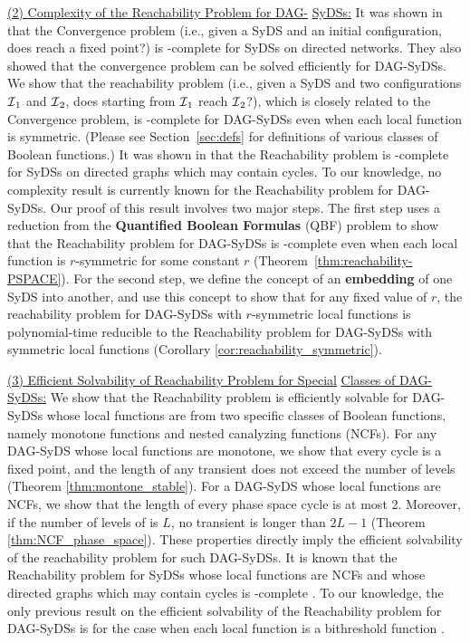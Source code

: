 \smallskip

\noindent
\underline{(2) Complexity of the Reachability Problem for DAG-}\newline
\underline{SyDSs:} 
It was shown in
\cite{Chistikov-etal-2020} that the Convergence problem
(i.e., given a SyDS \cals{} and an initial configuration,
does \cals{} reach a fixed point?) is \cpsp-complete
for SyDSs on directed networks.
They also showed that the convergence problem can be solved efficiently
for DAG-SyDSs.
We show that the reachability problem
(i.e., given a SyDS \cals{} and two configurations $\mbox{$\mathcal{I}$}_1$ and $\mbox{$\mathcal{I}$}_2$,
does \cals{} starting from $\mbox{$\mathcal{I}$}_1$ reach $\mbox{$\mathcal{I}$}_2$?),
which is closely related
to the Convergence problem, is \cpsp-complete for DAG-SyDSs even
when each local function is symmetric.
(Please see Section~\ref{sec:defs} for definitions of various classes
of Boolean functions.)
It was shown in \cite{OU-2017} that the Reachability
problem is \cpsp-complete for SyDSs on directed graphs 
which may contain cycles.
To our knowledge, no complexity result is currently known for
the Reachability problem for DAG-SyDSs.
Our proof of this result involves two major steps.
The first step uses a reduction from the \textbf{Quantified Boolean Formulas}
(QBF) problem \cite{GJ-1979} to show that the Reachability problem for DAG-SyDSs is
\cpsp-complete even when each local function is $r$-symmetric for 
some constant $r$ (Theorem~\ref{thm:reachability-PSPACE}).
For the second step,
we define the concept of an \textbf{embedding} of one SyDS into another,
and use this concept to show that
for any fixed value of $r$, 
the reachability problem for DAG-SyDSs with $r$-symmetric local functions 
is polynomial-time reducible to the Reachability problem for DAG-SyDSs with
symmetric  local functions (Corollary \ref{cor:reachability_symmetric}).

\smallskip

\noindent
\underline{(3) Efficient Solvability of Reachability Problem for Special}\newline
\underline{Classes of DAG-SyDSs:} 
We show that the Reachability problem is efficiently solvable for
DAG-SyDSs whose local functions are from two specific
classes of Boolean functions, namely monotone functions and
nested canalyzing functions (NCFs).
For any DAG-SyDS whose local functions are monotone,
we show that every cycle is a fixed point, 
and the length of any transient does not exceed the number of levels
(Theorem \ref{thm:montone_stable}).
For a DAG-SyDS \cals{} whose local functions are NCFs, we show
that the length of every phase space cycle is at most 2.
Moreover, if the number of levels of  \cals{} is $L$,
no transient is longer than $2L-1$
(Theorem \ref{thm:NCF_phase_space}).
These properties
directly imply the efficient solvability of the reachability
problem for such DAG-SyDSs.
It is known that the Reachability problem for SyDSs whose local
functions are NCFs and whose directed graphs which may contain cycles  
is \cpsp-complete \cite{Rosenkrantz-etal-2018}.
To our knowledge, the only previous result on the efficient
solvability of the  Reachability problem for DAG-SyDSs is
for the case when each local function is a bithreshold
function \cite{KKM+2013}.


